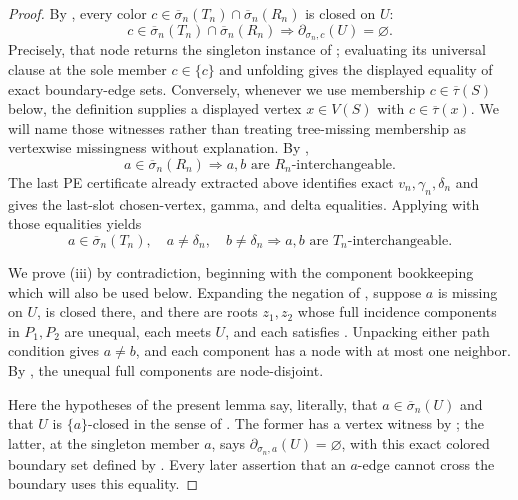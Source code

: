\begin{proof}
By , every color
$c\in\overline\sigma_n(T_n)\cap\overline\sigma_n(R_n)$ is closed
on $U$:
\[
 c\in\overline\sigma_n(T_n)\cap\overline\sigma_n(R_n)
 \Longrightarrow \partial_{\sigma_n,c}(U)=\varnothing.       \tag{5}
\]
Precisely, that node returns the singleton instance of
; evaluating its universal clause at the sole
member $c\in\{c\}$ and unfolding  gives the
displayed equality of exact boundary-edge sets.  Conversely, whenever we
use membership $c\in\overline\tau(S)$ below, the definition
 supplies a displayed vertex $x\in V(S)$ with
$c\in\overline\tau(x)$.  We will name those witnesses rather than treating
tree-missing membership as vertexwise missingness without explanation.
By ,
\[
 a\in\overline\sigma_n(R_n)
 \Longrightarrow a,b\text{ are $R_n$-interchangeable}.        \tag{7}
\]
The last PE certificate already extracted above identifies exact
$v_n,\gamma_n,\delta_n$ and gives the last-slot chosen-vertex, gamma,
and delta equalities.  Applying
 with those equalities yields
\[
 a\in\overline\sigma_n(T_n),\quad a\ne\delta_n,\quad
 b\ne\delta_n
 \Longrightarrow a,b\text{ are $T_n$-interchangeable}.        \tag{8}
\]

We prove (iii) by contradiction, beginning with the component bookkeeping
which will also be used below.  Expanding the negation of
, suppose $a$ is missing on $U$, is closed
there, and there are roots $z_1,z_2$ whose full incidence components in
$P_1,P_2$ are unequal, each meets $U$, and each satisfies
.  Unpacking either path condition gives
$a\ne b$, and each component has a node with at most one neighbor.  By
, the unequal full components are
node-disjoint.

Here the hypotheses of the present lemma say, literally, that
$a\in\overline\sigma_n(U)$ and that $U$ is
$\{a\}$-closed in the sense of .
The former has a vertex witness by ; the latter,
at the singleton member $a$, says
$\partial_{\sigma_n,a}(U)=\varnothing$, with this exact colored boundary
set defined by .  Every later assertion that
an $a$-edge cannot cross the boundary uses this equality.


\end{proof}
